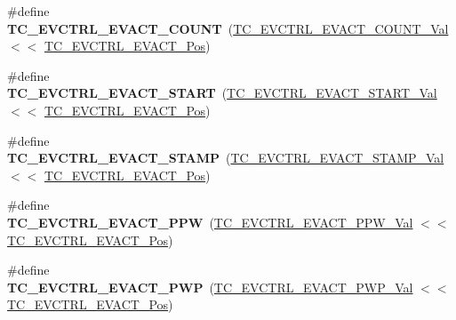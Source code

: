 \begin{DoxyCompactItemize}
\item 
\hypertarget{group___s_a_m_l21___t_c_ga6549f92396216665ea1058c44417b02d}{}\#define {\bfseries T\+C\+\_\+\+E\+V\+C\+T\+R\+L\+\_\+\+E\+V\+A\+C\+T\+\_\+\+C\+O\+U\+N\+T}~(\hyperlink{group___s_a_m_l21___t_c_gaf491ae01652acf31a121fc976e34ec0c}{T\+C\+\_\+\+E\+V\+C\+T\+R\+L\+\_\+\+E\+V\+A\+C\+T\+\_\+\+C\+O\+U\+N\+T\+\_\+\+Val}     $<$$<$ \hyperlink{group___s_a_m_l21___t_c_ga29f3c9802b04bc3c9e151e388abf2f08}{T\+C\+\_\+\+E\+V\+C\+T\+R\+L\+\_\+\+E\+V\+A\+C\+T\+\_\+\+Pos})\label{group___s_a_m_l21___t_c_ga6549f92396216665ea1058c44417b02d}

\item 
\hypertarget{group___s_a_m_l21___t_c_gaee0eff85186ad39c23aab9f7272547e2}{}\#define {\bfseries T\+C\+\_\+\+E\+V\+C\+T\+R\+L\+\_\+\+E\+V\+A\+C\+T\+\_\+\+S\+T\+A\+R\+T}~(\hyperlink{group___s_a_m_l21___t_c_ga2851bff08dbc48025416547d4274e508}{T\+C\+\_\+\+E\+V\+C\+T\+R\+L\+\_\+\+E\+V\+A\+C\+T\+\_\+\+S\+T\+A\+R\+T\+\_\+\+Val}     $<$$<$ \hyperlink{group___s_a_m_l21___t_c_ga29f3c9802b04bc3c9e151e388abf2f08}{T\+C\+\_\+\+E\+V\+C\+T\+R\+L\+\_\+\+E\+V\+A\+C\+T\+\_\+\+Pos})\label{group___s_a_m_l21___t_c_gaee0eff85186ad39c23aab9f7272547e2}

\item 
\hypertarget{group___s_a_m_l21___t_c_ga26d483ac797f5fffcca2127c1f9bdc98}{}\#define {\bfseries T\+C\+\_\+\+E\+V\+C\+T\+R\+L\+\_\+\+E\+V\+A\+C\+T\+\_\+\+S\+T\+A\+M\+P}~(\hyperlink{group___s_a_m_l21___t_c_ga8b98663a8df3b5aa57593cd8a06448b4}{T\+C\+\_\+\+E\+V\+C\+T\+R\+L\+\_\+\+E\+V\+A\+C\+T\+\_\+\+S\+T\+A\+M\+P\+\_\+\+Val}     $<$$<$ \hyperlink{group___s_a_m_l21___t_c_ga29f3c9802b04bc3c9e151e388abf2f08}{T\+C\+\_\+\+E\+V\+C\+T\+R\+L\+\_\+\+E\+V\+A\+C\+T\+\_\+\+Pos})\label{group___s_a_m_l21___t_c_ga26d483ac797f5fffcca2127c1f9bdc98}

\item 
\hypertarget{group___s_a_m_l21___t_c_ga8ea28c06e47fa44248eb0a62cf417974}{}\#define {\bfseries T\+C\+\_\+\+E\+V\+C\+T\+R\+L\+\_\+\+E\+V\+A\+C\+T\+\_\+\+P\+P\+W}~(\hyperlink{group___s_a_m_l21___t_c_gacc79333089f684803e5f0e892b0c7f03}{T\+C\+\_\+\+E\+V\+C\+T\+R\+L\+\_\+\+E\+V\+A\+C\+T\+\_\+\+P\+P\+W\+\_\+\+Val}       $<$$<$ \hyperlink{group___s_a_m_l21___t_c_ga29f3c9802b04bc3c9e151e388abf2f08}{T\+C\+\_\+\+E\+V\+C\+T\+R\+L\+\_\+\+E\+V\+A\+C\+T\+\_\+\+Pos})\label{group___s_a_m_l21___t_c_ga8ea28c06e47fa44248eb0a62cf417974}

\item 
\hypertarget{group___s_a_m_l21___t_c_ga7483fe4fe340d217dd80d682fa0f6869}{}\#define {\bfseries T\+C\+\_\+\+E\+V\+C\+T\+R\+L\+\_\+\+E\+V\+A\+C\+T\+\_\+\+P\+W\+P}~(\hyperlink{group___s_a_m_l21___t_c_gab0aa01d513903be5490afa1e56e27486}{T\+C\+\_\+\+E\+V\+C\+T\+R\+L\+\_\+\+E\+V\+A\+C\+T\+\_\+\+P\+W\+P\+\_\+\+Val}       $<$$<$ \hyperlink{group___s_a_m_l21___t_c_ga29f3c9802b04bc3c9e151e388abf2f08}{T\+C\+\_\+\+E\+V\+C\+T\+R\+L\+\_\+\+E\+V\+A\+C\+T\+\_\+\+Pos})\label{group___s_a_m_l21___t_c_ga7483fe4fe340d217dd80d682fa0f6869}


\end{DoxyCompactItemize}
